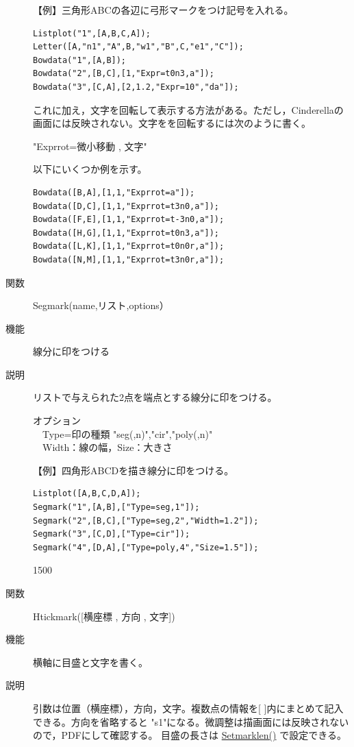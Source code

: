 \documentclass[papersize,a4paper,12pt,uplatex]{jsarticle}
\begin{document}
\begin{description}
【例】三角形ABCの各辺に弓形マークをつけ記号を入れる。
\begin{verbatim}
Listplot("1",[A,B,C,A]);
Letter([A,"n1","A",B,"w1","B",C,"e1","C"]);
Bowdata("1",[A,B]);
Bowdata("2",[B,C],[1,"Expr=t0n3,a"]);
Bowdata("3",[C,A],[2,1.2,"Expr=10","da"]);
\end{verbatim}

\vspace{\baselineskip}
これに加え，文字を回転して表示する方法がある。ただし，Cinderellaの画面には反映されない。文字をを回転するには次のように書く。

\hspace{10mm}"Exprrot=微小移動 , 文字"

以下にいくつか例を示す。
\begin{verbatim}
Bowdata([B,A],[1,1,"Exprrot=a"]);
Bowdata([D,C],[1,1,"Exprrot=t3n0,a"]);
Bowdata([F,E],[1,1,"Exprrot=t-3n0,a"]);
Bowdata([H,G],[1,1,"Exprrot=t0n3,a"]);
Bowdata([L,K],[1,1,"Exprrot=t0n0r,a"]);
Bowdata([N,M],[1,1,"Exprrot=t3n0r,a"]);
\end{verbatim}
\hspace{10mm} \scalebox{0.7}{}


\hypertarget{segmark}{}
\item[関数]Segmark(name,リスト,options）
\item[機能]線分に印をつける
\item[説明]リストで与えられた2点を端点とする線分に印をつける。

オプション\\
　Type=印の種類 "seg(,n)","cir","poly(,n)"\\
　Width：線の幅，Size：大きさ

【例】四角形ABCDを描き線分に印をつける。

\begin{verbatim}
Listplot([A,B,C,D,A]);
Segmark("1",[A,B],["Type=seg,1"]); 
Segmark("2",[B,C],["Type=seg,2","Width=1.2"]);
Segmark("3",[C,D],["Type=cir"]);
Segmark("4",[D,A],["Type=poly,4","Size=1.5"]);
\end{verbatim}

\begin{layer}{150}{0}
\end{layer}


\hypertarget{htickmark}{}
\item[関数]Htickmark([横座標 , 方向 , 文字])
\item[機能]横軸に目盛と文字を書く。
\item[説明]引数は位置（横座標），方向，文字。複数点の情報を[ ]内にまとめて記入できる。方向を省略すると "s1"になる。微調整は描画面には反映されないので，PDFにして確認する。
目盛の長さは \hyperlink{setmarklen}{Setmarklen()} で設定できる。


\end{description}
\end{document}
